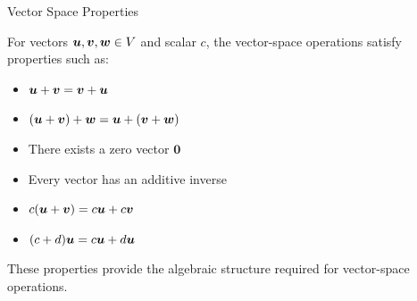 
\begin{frame}{Vector Space Properties}

For vectors $\bm{u},\bm{v},\bm{w}\in V$ and scalar $c$,
the vector-space operations satisfy properties such as:

\begin{itemize}
    \item $\bm{u}+\bm{v}=\bm{v}+\bm{u}$
    \item $(\bm{u}+\bm{v})+\bm{w}
    =\bm{u}+(\bm{v}+\bm{w})$
    \item There exists a zero vector $\mathbf{0}$
    \item Every vector has an additive inverse
    \item $c(\bm{u}+\bm{v})
    =c\bm{u}+c\bm{v}$
    \item $(c+d)\bm{u}
    =c\bm{u}+d\bm{u}$
\end{itemize}

\vspace{0.2cm}

These properties provide the algebraic structure required
for vector-space operations.

\end{frame}



